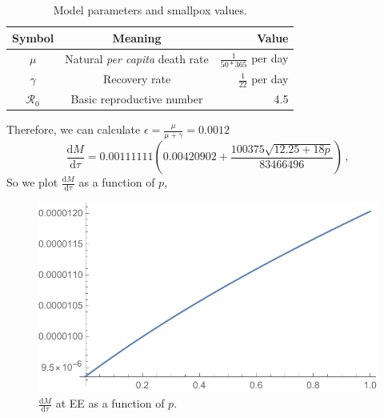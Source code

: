 \documentclass[12pt]{article}
\newcommand\dbyd[2]{\frac{\mathrm d{#1}}{\mathrm d{#2}}}
\newcommand{\R}{\mathcal{R}}
\begin{document}
\begin{table}[H]
\begin{center}
\caption{Model parameters and smallpox values.}
\label{tab:params}
\smallskip
\begin{tabular}{c|c|r}
{\bfseries Symbol} & {\bfseries Meaning} & {\bfseries Value} \\\hline
$\mu$ & Natural \emph{per capita} death rate & $\frac{1}{50*365}$ per day \\
$\gamma$ & Recovery rate & $\frac{1}{22}$ per day \\
$\R_0$ & Basic reproductive number & 4.5
\end{tabular}
\end{center}
\end{table}

Therefore, we can calculate $\epsilon=\frac{\mu}{\mu+\gamma}=0.0012$
\begin{equation}
\dbyd{M}{\tau}=0.00111111(0.00420902+\frac{100375\sqrt{12.25+18p}}{83466496})\,,
\end{equation}
So we plot $\dbyd{M}{\tau}$ as a function of $p$,
\begin{figure}[H]
  \centering
  \includegraphics[width=1\textwidth]{Figures/Plot_dmdt_as_f_of_p.pdf}
  \caption{$\dbyd{M}{\tau}$ at EE as a function of $p$.}
\label{fig:dMdt}
\end{figure}
\end{document}
